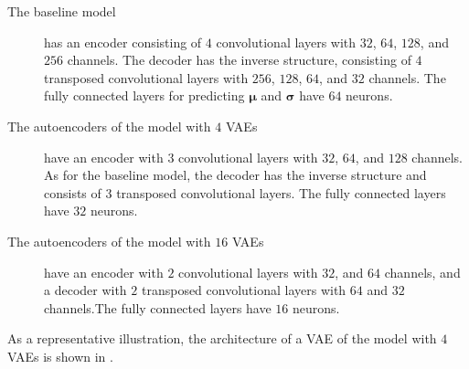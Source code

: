 \begin{description}
   \item[The baseline model] has an encoder consisting of $4$ convolutional layers with $32$, $64$, $128$, and $256$ channels. The decoder has the inverse structure, consisting of $4$ transposed convolutional layers with $256$, $128$, $64$, and $32$ channels. The fully connected layers for predicting $\boldsymbol{\mu}$ and $\boldsymbol{\sigma}$ have $64$ neurons.
 \item[The autoencoders of the model with $4$ VAEs] have an encoder with $3$ convolutional layers with $32$, $64$, and $128$ channels. As for the baseline model, the decoder has the inverse structure and consists of $3$ transposed convolutional layers. The fully connected layers have $32$ neurons.
  \item[The autoencoders of the model with $16$ VAEs] have an encoder with $2$ convolutional layers with $32$, and $64$ channels, and a decoder with $2$ transposed convolutional layers with $64$ and $32$ channels.The fully connected layers have $16$ neurons.
\end{description}

As a representative illustration, the architecture of a VAE of the model with $4$ VAEs is shown in .

